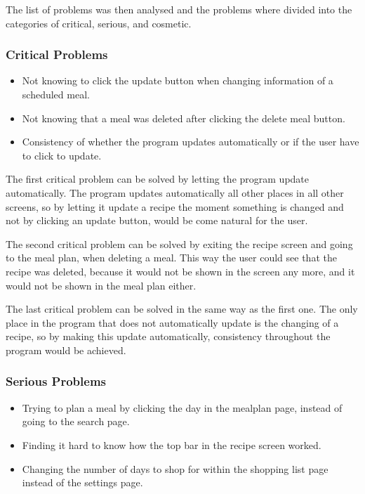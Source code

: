 The list of problems was then analysed and the problems where divided into the categories of critical, serious, and cosmetic.

\subsubsection{Critical Problems}

\begin{itemize}
    \item Not knowing to click the update button when changing information of a scheduled meal.
    \item Not knowing that a meal was deleted after clicking the delete meal button.
    \item Consistency of whether the program updates automatically or if the user have to click to update.
\end{itemize}    
The first critical problem can be solved by letting the program update automatically. The program updates automatically all other places in all other screens, so by letting it update a recipe the moment something is changed and not by clicking an update button, would be come natural for the user.

The second critical problem can be solved by exiting the recipe screen and going to the meal plan, when deleting a meal. This way the user could see that the recipe was deleted, because it would not be shown in the screen any more, and it would not be shown in the meal plan either.

The last critical problem can be solved in the same way as the first one. The only place in the program that does not automatically update is the changing of a recipe, so by making this update automatically, consistency throughout the program would be achieved.

\subsubsection{Serious Problems}

\begin{itemize}
    \item Trying to plan a meal by clicking the day in the mealplan page, instead of going to the search page.
    \item Finding it hard to know how the top bar in the recipe screen worked.
    \item Changing the number of days to shop for within the shopping list page instead of the settings page.
\end{itemize}

